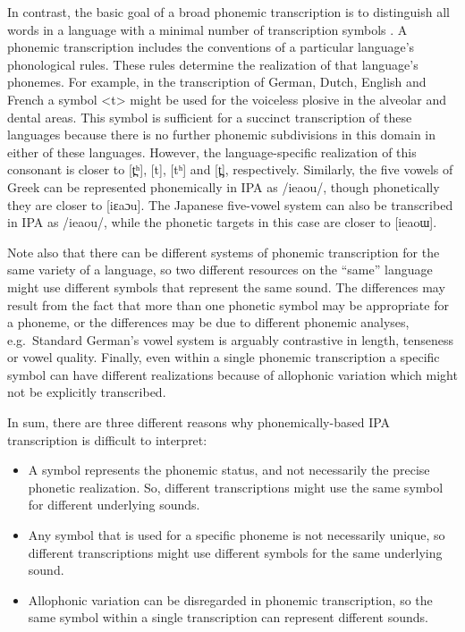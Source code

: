 In contrast, the basic goal of a broad phonemic transcription is to distinguish all
words in a language with a minimal number of transcription symbols
\citep[19]{Abercrombie1964}. A phonemic transcription includes the conventions
of a particular language's phonological rules. These rules determine the
realization of that language's phonemes. For example, in the transcription of
German, Dutch, English and French a symbol <t> might be used for the voiceless
plosive in the alveolar and dental areas. This symbol is sufficient for a succinct
transcription of these languages because there is no further phonemic
subdivisions in this domain in either of these languages. However, the
language-specific realization of this consonant is closer to [t̪ʰ], [t], [tʰ]
and [t̪], respectively. Similarly, the five vowels of Greek can be represented
phonemically in IPA as /ieaou/, though phonetically they are closer to [iεaɔu].
The Japanese five-vowel system can also be transcribed in IPA as
/ieaou/, while the phonetic targets in this case are closer to [ieaoɯ].

Note also that there can be different systems of phonemic transcription for the
same variety of a language, so two different resources on the ``same'' language
might use different symbols that represent the same sound. The differences may
result from the fact that more than one phonetic symbol may be appropriate for a
phoneme, or the differences may be due to different phonemic analyses, e.g.\
Standard German's vowel system is arguably contrastive in length, tenseness or
vowel quality. Finally, even within a single phonemic transcription a specific
symbol can have different realizations because of allophonic variation which 
might not be explicitly transcribed.

In sum, there are three different reasons why phonemically-based IPA 
transcription is difficult to interpret:

\begin{itemize}
  
   \item A symbol represents the phonemic status, and not necessarily the
         precise phonetic realization. So, different transcriptions might use 
         the same symbol for different underlying sounds.
   \item Any symbol that is used for a specific phoneme is not necessarily
         unique, so different transcriptions might use different symbols for the
         same underlying sound.
   \item Allophonic variation can be disregarded in phonemic transcription, so
         the same symbol within a single transcription can represent different
         sounds.
  
\end{itemize}

